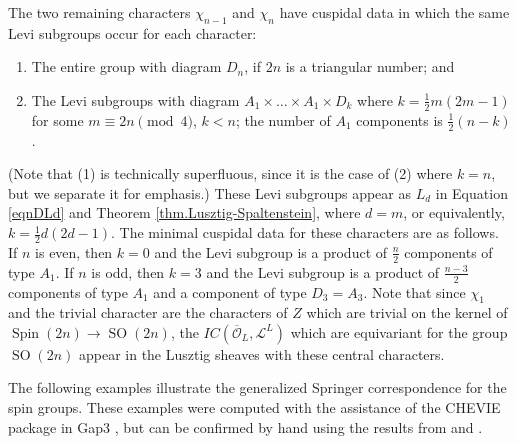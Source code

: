 \documentclass[reqno,11pt]{amsart}
\theoremstyle{remark}
\theoremstyle{remark}
\theoremstyle{definition}
\theoremstyle{definition}
\theoremstyle{definition}
\numberwithin{equation}{section}
\newcommand{\SO}{\operatorname{SO}}
\newcommand{\Spin}{\operatorname{Spin}}
\newcommand{\cl}{\mathcal{L}}
\newcommand{\co}{\mathcal{O}}
\begin{document}
The two remaining characters $\chi_{n-1}$ and $\chi_n$ have cuspidal data in which the same Levi subgroups occur for each character: 
\begin{enumerate}
\item The entire group with diagram $D_n$, if $2n$ is a triangular number; and
\item The Levi subgroups with diagram $A_1\times\dots \times A_1\times D_k$ where $k=\frac{1}{2}m(2m-1)$ for some $m\equiv 2n\pmod 4$, $k<n$; the number of $A_1$ components is $\tfrac{1}{2}(n-k)$. 
\end{enumerate}
(Note that (1) is technically superfluous, since it is the case of (2) where $k = n$, but we separate it for emphasis.)
These Levi subgroups appear as $L_d$ in Equation \eqref{eqnDLd} and Theorem \ref{thm.Lusztig-Spaltenstein}, where $d=m$, or equivalently, $k = \frac{1}{2}d(2d-1)$.
The minimal cuspidal data for these characters are as follows.   If $n$ is even, then $k = 0$ and the Levi subgroup is a product of $\tfrac{n}{2}$ components of type $A_1$.
If $n$ is odd, then $k = 3$ and the Levi subgroup is a product of $\tfrac{n-3}{2}$ components of type $A_1$ and a component of type $D_3=A_3$.
Note that since $\chi_1$ and the trivial character are the characters of $Z$ which are trivial on the kernel of 
$\Spin(2n) \to \SO(2n)$, the $IC(\overline{\co}_L, \cl^L)$ which are equivariant for the group $\SO(2n)$ appear in the Lusztig sheaves with these central characters.

The following examples illustrate the generalized Springer correspondence for the spin groups. These examples were computed with the assistance of the CHEVIE package in Gap3 \cite{GH96}, but can be confirmed by hand using the results from \cite{Lu84} and \cite{LuSpal85}.
\end{document}
